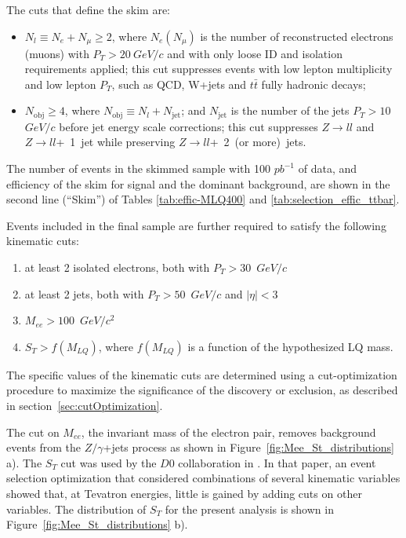 \documentclass{cmspaper}
\begin{document}
\begin{linenumbers}
The cuts that define the skim  are:
\begin{itemize}
\item $N_l \equiv N_e + N_{\mu} \ge 2$, where $N_e (N_{\mu})$ is the number of reconstructed electrons (muons)
with $P_T>20~$$GeV/c$ and with only loose ID and isolation requirements 
applied; this cut suppresses events with low 
lepton multiplicity and low lepton $P_T$, such as QCD, W+jets and $t\bar{t}$ fully hadronic decays;
\item $N_{\mathrm{obj}} \ge 4$, where $N_{\mathrm{obj}} \equiv N_l + N_{\mathrm{jet}}$; and
$N_{\mathrm{jet}}$ is the number of the jets $P_T > 10~$$GeV/c$ before jet
energy scale corrections; this cut suppresses $Z \rightarrow ll$ and 
$Z \rightarrow ll$+~1~jet while preserving $Z \rightarrow ll$+~2~(or more)~jets.
\end{itemize}

The number of events in the skimmed sample with 100 $pb^{-1}$ of data, and 
efficiency of the skim for signal and the dominant background, are shown in the second line (``Skim'') 
of Tables
\ref{tab:effic-MLQ400} and 
\ref{tab:selection_effic_ttbar}.

Events included in the final sample are further required to satisfy 
the following kinematic cuts:
%
\begin{enumerate}
\item at least 2 isolated electrons, both with $P_T>30$~$GeV/c$ 
\item at least 2 jets, both with $P_T>50$~$GeV/c$ and $|\eta|<3$
\item $M_{ee}>100$~$GeV/c^2$
\item $S_T>f(M_{LQ})$, where $f(M_{LQ})$ is a function 
of the hypothesized LQ mass.
\end{enumerate}
%

The specific values of the kinematic cuts are determined 
using a cut-optimization procedure to maximize the significance of
the discovery or exclusion, as described in section~\ref{sec:cutOptimization}.

The cut on $M_{ee}$, the invariant mass of the electron pair, 
removes background events from the
$Z/\gamma$+jets process as shown in Figure~\ref{fig:Mee_St_distributions} a).
The $S_T$ cut was used by the $D0$ collaboration in 
\cite{Abazov:2001mx}. In that paper, an event 
selection optimization that considered
combinations of several kinematic variables 
showed that, at Tevatron energies,  little is gained by 
adding cuts on other variables. The distribution of $S_T$ for the present
analysis is shown in Figure~\ref{fig:Mee_St_distributions} b).



\end{linenumbers}
\end{document}
